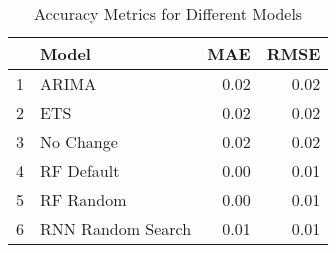 \begin{table}[ht]
\centering
\caption{Accuracy Metrics for Different Models} 
\begin{tabular}{rlrr}
  \hline
 & Model & MAE & RMSE \\ 
  \hline
1 & ARIMA & 0.02 & 0.02 \\ 
  2 & ETS & 0.02 & 0.02 \\ 
  3 & No Change & 0.02 & 0.02 \\ 
  4 & RF Default & 0.00 & 0.01 \\ 
  5 & RF Random & 0.00 & 0.01 \\ 
  6 & RNN Random Search & 0.01 & 0.01 \\ 
   \hline
\end{tabular}
\end{table}
